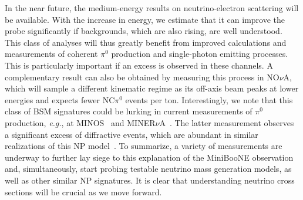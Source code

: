 In the near future, the \minerva medium-energy results on neutrino-electron scattering will be available. With the increase in energy, we estimate that it can improve the probe significantly if backgrounds, which are also rising, are well understood.
This class of analyses will thus greatly benefit from improved calculations and measurements of coherent $\pi^0$ production and single-photon emitting processes. This is particularly important if an excess is observed in these channels.
A complementary result can also be obtained by measuring this process in NO$\nu$A, which will sample a different kinematic regime as its off-axis beam peaks at lower energies and expects fewer NC$\pi^0$ events per ton. 
Interestingly, we note that this class of BSM signatures could be lurking in current measurements of $\pi^0$ production, \textit{e.g.}, at MINOS~\cite{Adamson:2016hyz} and MINER$\nu$A~\cite{Wolcott:2016hws}. The latter measurement observes a significant excess of diffractive events, which are abundant in similar realizations of this NP model~\cite{Ballett:2018ynz}.
To summarize, a variety of measurements are underway to further lay siege to this explanation of the MiniBooNE observation and, simultaneously, start probing testable neutrino mass generation models, as well as other similar NP signatures. It is clear that understanding neutrino cross sections will be crucial as we move forward.
